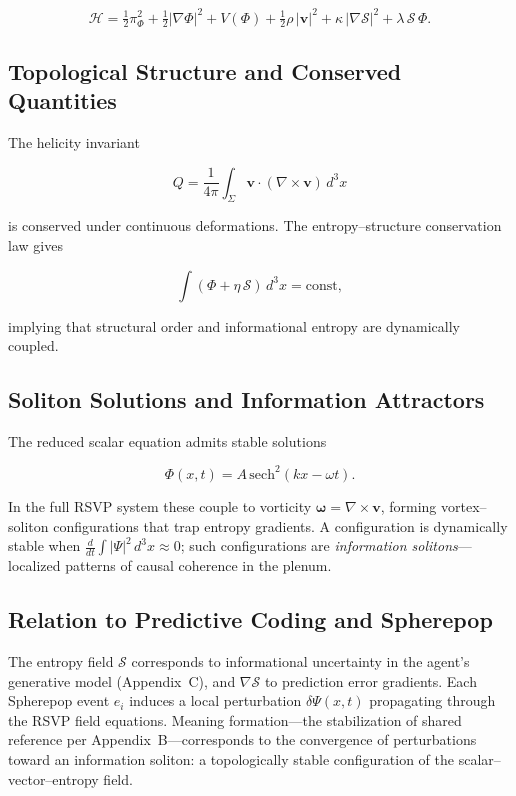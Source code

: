 \documentclass[12pt,a4paper]{article}
\begin{document}
\[
\mathcal{H}
= \tfrac{1}{2}\pi_\Phi^2
+ \tfrac{1}{2}|\nabla\Phi|^2
+ V(\Phi)
+ \tfrac{1}{2}\rho\,|\mathbf{v}|^2
+ \kappa\,|\nabla\mathcal{S}|^2
+ \lambda\,\mathcal{S}\,\Phi.
\]

\subsection*{Topological Structure and Conserved Quantities}

The helicity invariant

\[
Q = \frac{1}{4\pi}\int_\Sigma \mathbf{v}\cdot(\nabla\times\mathbf{v})\,d^3x
\]

is conserved under continuous deformations. The entropy--structure conservation law gives

\[
\int (\Phi + \eta\,\mathcal{S})\,d^3x = \mathrm{const},
\]

implying that structural order and informational entropy are dynamically coupled.

\subsection*{Soliton Solutions and Information Attractors}

The reduced scalar equation admits stable solutions

\[
\Phi(x,t) = A\,\mathrm{sech}^2(kx - \omega t).
\]

In the full RSVP system these couple to vorticity $\boldsymbol{\omega} = \nabla\times\mathbf{v}$,
forming vortex--soliton configurations that trap entropy gradients. A configuration is
dynamically stable when $\frac{d}{dt}\!\int|\Psi|^2\,d^3x \approx 0$; such configurations
are \emph{information solitons}---localized patterns of causal coherence in the plenum.

\subsection*{Relation to Predictive Coding and Spherepop}

The entropy field $\mathcal{S}$ corresponds to informational uncertainty in the agent's
generative model (Appendix~C), and $\nabla\mathcal{S}$ to prediction error gradients. Each
Spherepop event $e_i$ induces a local perturbation $\delta\Psi(x,t)$ propagating through the
RSVP field equations. Meaning formation---the stabilization of shared reference per
Appendix~B---corresponds to the convergence of perturbations toward an information soliton:
a topologically stable configuration of the scalar--vector--entropy field.
\end{document}
